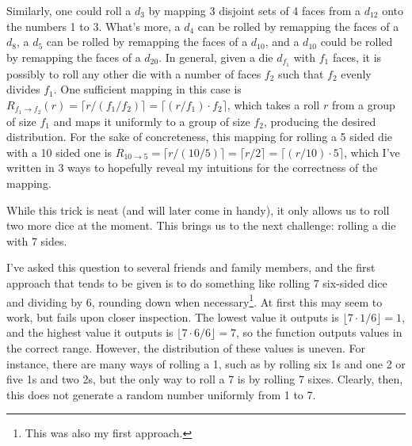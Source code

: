 \documentclass{article}
\begin{document}
\par Similarly, one could roll a $d_3$ by mapping 3 disjoint sets of 4 faces from a $d_{12}$ onto the numbers 1 to 3.
What's more, a $d_4$ can be rolled by remapping the faces of a $d_8$, a $d_5$ can be rolled by remapping the faces of a $d_{10}$, and a $d_{10}$ could be rolled by remapping the faces of a $d_{20}$. 
In general, given a die $d_{f_1}$ with $f_1$ faces, it is possibly to roll any other die with a number of faces $f_2$ such that $f_2$ evenly divides $f_1$.
One sufficient mapping in this case is $R_{f_1 \to f_2}(r) = \lceil r / (f_1 / f_2) \rceil = \lceil (r / f_1) \cdot f_2 \rceil$, which takes a roll $r$ from a group of size $f_1$ and maps it uniformly to a group of size $f_2$, producing the desired distribution.
For the sake of concreteness, this mapping for rolling a 5 sided die with a 10 sided one is $R_{10 \to 5} = \lceil r / (10 / 5) \rceil = \lceil r / 2 \rceil = \lceil (r / 10) \cdot 5 \rceil$, which I've written in 3 ways to hopefully reveal my intuitions for the correctness of the mapping.

\par While this trick is neat (and will later come in handy), it only allows us to roll two more dice at the moment.
This brings us to the next challenge: rolling a die with 7 sides. 

\par I've asked this question to several friends and family members, and the first approach that tends to be given is to do something like rolling 7 six-sided dice and dividing by 6, rounding down when necessary\footnote{This was also my first approach.}.
At first this may seem to work, but fails upon closer inspection.
The lowest value it outputs is $\lfloor 7 \cdot 1 / 6 \rfloor = 1$, and the highest value it outputs is $\lfloor 7 \cdot 6 / 6 \rfloor = 7$, so the function outputs values in the correct range.
However, the distribution of these values is uneven.
For instance, there are many ways of rolling a 1, such as by rolling six 1s and one 2 or five 1s and two 2s, but the only way to roll a 7 is by rolling 7 sixes.
Clearly, then, this does not generate a random number uniformly from 1 to 7.
\end{document}
